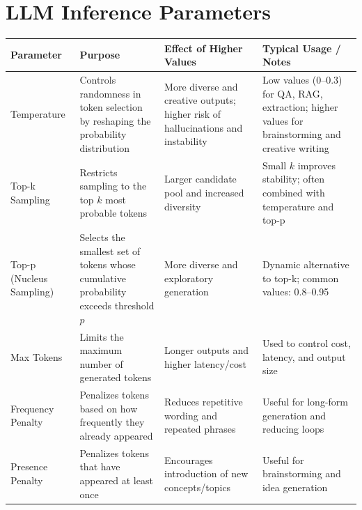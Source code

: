 \documentclass[10pt,a4paper]{article}
\begin{document}
\section{LLM Inference Parameters}
\begin{table}[H]
\centering
\small
\begin{tabular}{|p{3cm}|p{4.5cm}|p{3.5cm}|p{4cm}|}
\hline

\textbf{Parameter} &
\textbf{Purpose} &
\textbf{Effect of Higher Values} &
\textbf{Typical Usage / Notes} \\

\hline

Temperature &
Controls randomness in token selection by reshaping the probability distribution &
More diverse and creative outputs; higher risk of hallucinations and instability &
Low values (0--0.3) for QA, RAG, extraction; higher values for brainstorming and creative writing \\

\hline

Top-k Sampling &
Restricts sampling to the top $k$ most probable tokens &
Larger candidate pool and increased diversity &
Small $k$ improves stability; often combined with temperature and top-p \\

\hline

Top-p (Nucleus Sampling) &
Selects the smallest set of tokens whose cumulative probability exceeds threshold $p$ &
More diverse and exploratory generation &
Dynamic alternative to top-k; common values: 0.8--0.95 \\

\hline

Max Tokens &
Limits the maximum number of generated tokens &
Longer outputs and higher latency/cost &
Used to control cost, latency, and output size \\

\hline

Frequency Penalty &
Penalizes tokens based on how frequently they already appeared &
Reduces repetitive wording and repeated phrases &
Useful for long-form generation and reducing loops \\

\hline

Presence Penalty &
Penalizes tokens that have appeared at least once &
Encourages introduction of new concepts/topics &
Useful for brainstorming and idea generation \\

\hline


\end{tabular}
\end{table}
\end{document}
